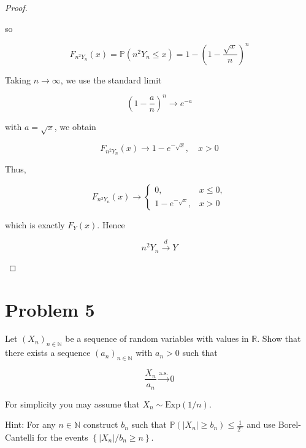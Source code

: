 \begin{proof}
\begin{itemize}
  so

  \[\mathit{F}_{\mathit{n}^{2}\mathit{Y}_{\mathit{n}}}(\mathit{x}) = \mathbb{P}(\mathit{n}^{2}\mathit{Y}_{\mathit{n}} \leq \mathit{x}) = 1 - \left( {1 - \frac{\sqrt{\mathit{x}}}{\mathit{n}}} \right)^{\mathit{n}}\]

  Taking \(\mathit{n}\rightarrow\infty\), we use the standard limit

  \[\left( {1 - \frac{\mathit{a}}{\mathit{n}}} \right)^{\mathit{n}}\rightarrow\mathit{e}^{- \mathit{a}}\]

  with \(\mathit{a} = \sqrt{\mathit{x}}\), we obtain

  \[\mathit{F}_{\mathit{n}^{2}\mathit{Y}_{\mathit{n}}}(\mathit{x})\rightarrow 1 - \mathit{e}^{- \sqrt{\mathit{x}}},\quad\mathit{x} > 0\]

  Thus,

  \[\mathit{F}_{\mathit{n}^{2}\mathit{Y}_{\mathit{n}}}(\mathit{x})\rightarrow\left\{ \begin{matrix}
  {0,} & {\mathit{x} \leq 0,} \\
  {1 - \mathit{e}^{- \sqrt{\mathit{x}}},} & {\mathit{x} > 0}
  \end{matrix} \right.\]

  which is exactly \(\mathit{F}_{\mathit{Y}}(\mathit{x})\). Hence

  \[\mathit{n}^{2}\mathit{Y}_{\mathit{n}}\overset{\mathit{d}}{\rightarrow}\mathit{Y}\]
\end{itemize}

\end{proof}

\section{Problem 5}\label{hw05-problem-5}

Let \(\left( \mathit{X}_{\mathit{n}} \right)_{\mathit{n} \in \mathbb{N}}\) be a sequence of random variables with values in \(\mathbb{R}\). Show that there exists a sequence \(\left( \mathit{a}_{\mathit{n}} \right)_{\mathit{n} \in \mathbb{N}}\) with \(\mathit{a}_{\mathit{n}} > 0\) such that

\[\frac{\mathit{X}_{\mathit{n}}}{\mathit{a}_{\mathit{n}}}\overset{\text{a.s.}}{\rightarrow}0\]

For simplicity you may assume that \(\mathit{X}_{\mathit{n}} \sim \text{Exp}(1/\mathit{n})\).

Hint: For any \(\mathit{n} \in \mathbb{N}\) construct \(\mathit{b}_{\mathit{n}}\) such that \(\mathbb{P}\left( {\left| \mathit{X}_{\mathit{n}} \right| \geq \mathit{b}_{\mathit{n}}} \right) \leq \frac{1}{2^{\mathit{n}}}\) and use Borel-Cantelli for the events \(\left\{ {\left| \mathit{X}_{\mathit{n}} \right|/\mathit{b}_{\mathit{n}} \geq \mathit{n}} \right\}\).

